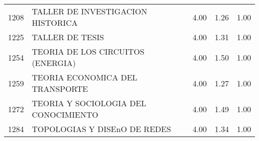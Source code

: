 \begin{table}[ht]
\begin{tabular}{rlrrr}
  1208 & TALLER DE INVESTIGACION HISTORICA & 4.00 & 1.26 & 1.00 \\ 
  1225 & TALLER DE TESIS & 4.00 & 1.31 & 1.00 \\ 
  1254 & TEORIA DE LOS CIRCUITOS (ENERGIA) & 4.00 & 1.50 & 1.00 \\ 
  1259 & TEORIA ECONOMICA DEL TRANSPORTE & 4.00 & 1.27 & 1.00 \\ 
  1272 & TEORIA Y SOCIOLOGIA DEL CONOCIMIENTO & 4.00 & 1.49 & 1.00 \\ 
  1284 & TOPOLOGIAS Y DISEnO DE REDES & 4.00 & 1.34 & 1.00 \\ 
   \hline
\end{tabular}
\end{table}
